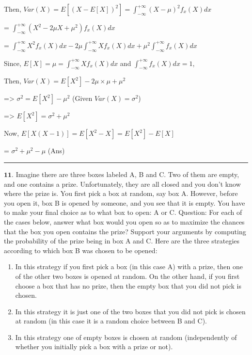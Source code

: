 \documentclass[11pt]{article}
\begin{document}
Then,
\(Var(X) = E[(X - E[X])^2] = \int_{-\infty}^{+\infty} (X-\mu)^2 f_x(X)dx\)

= \(\int_{-\infty}^{+\infty}(X^2 - 2 \mu X + \mu^2)f_x(X)dx\)

=
\(\int_{-\infty}^{+\infty} X^2f_x(X)dx - 2 \mu \int_{-\infty}^{+\infty} X f_x(X)dx + \mu^2 \int_{-\infty}^{+\infty} f_x(X)dx\)

Since, \(E[X] = \mu = \int_{-\infty}^{+\infty} Xf_x(X)dx\) and
\(\int_{-\infty}^{+\infty} f_x(X)dx = 1\),

Then, \(Var(X) = E[X^2] - 2 \mu \times \mu + \mu^2\)

=\textgreater{} \(\sigma^2 = E[X^2] - \mu^2\) (Given
\(Var(X) = \sigma^2\))

=\textgreater{} \(E[X^2] = \sigma^2 + \mu^2\)

Now, \(E[X(X-1)] = E[X^2 - X] = E[X^2] - E[X]\)

= \(\sigma^2 + \mu^2 - \mu\) (Ans)

    \begin{center}\rule{0.5\linewidth}{\linethickness}\end{center}

\(\textbf{11.}\) Imagine there are three boxes labeled A, B and C. Two
of them are empty, and one contains a prize. Unfortunately, they are all
closed and you don't know where the prize is. You first pick a box at
random, say box A. However, before you open it, box B is opened by
someone, and you see that it is empty. You have to make your final
choice as to what box to open: A or C. Question: For each of the cases
below, answer what box would you open so as to maximize the chances that
the box you open contains the prize? Support your arguments by computing
the probability of the prize being in box A and C. Here are the three
strategies according to which box B was chosen to be opened:

\begin{enumerate}
\def\labelenumi{\alph{enumi})}
\item
  In this strategy if you first pick a box (in this case A) with a
  prize, then one of the other two boxes is opened at random. On the
  other hand, if you first choose a box that has no prize, then the
  empty box that you did not pick is chosen.
\item
  In this strategy it is just one of the two boxes that you did not pick
  is chosen at random (in this case it is a random choice between B and
  C).
\item
  In this strategy one of empty boxes is chosen at random (independently
  of whether you initially pick a box with a prize or not).
\end{enumerate}
\end{document}
